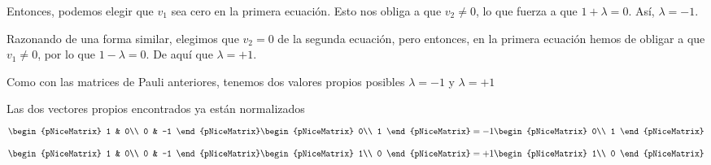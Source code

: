Entonces, podemos elegir que $v_1$ sea cero en la primera ecuación.
Esto nos obliga a que $v_2\neq 0$, lo que fuerza a que $1+\lambda = 0$.
Así, $\lambda = -1$.

Razonando de una forma similar, elegimos que $v_2 = 0$ de la segunda ecuación,
pero entonces, en la primera ecuación hemos de obligar a que $v_1\neq 0$, por
lo que $1-\lambda = 0$. De aquí que $\lambda = +1$.

Como con las matrices de Pauli anteriores, tenemos dos valores propios posibles
$\lambda = -1$ y $\lambda = +1$

Las dos vectores propios encontrados ya están normalizados
\[
  \begin{pNiceMatrix}
    1 & 0\\
    0 & -1
  \end{pNiceMatrix}
  \begin{pNiceMatrix}
    0\\
    1
  \end{pNiceMatrix}
  = -1
  \begin{pNiceMatrix}
    0\\
    1
  \end{pNiceMatrix}
\]
\[
  \begin{pNiceMatrix}
    1 & 0\\
    0 & -1
  \end{pNiceMatrix}
  \begin{pNiceMatrix}
    1\\
    0
  \end{pNiceMatrix}
  = +1
  \begin{pNiceMatrix}
    1\\
    0
  \end{pNiceMatrix}
\]











